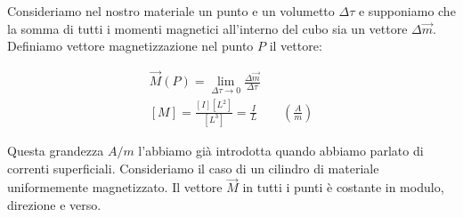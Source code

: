 Consideriamo nel nostro materiale un punto e un volumetto $ \Delta \tau  $ e supponiamo che la somma di tutti i momenti magnetici all'interno del cubo sia un vettore $ \Delta \vec{m}  $. Definiamo vettore magnetizzazione nel punto $P$ il vettore:

\begin{gather*}
	\boxed{\vec{M} (P)=\lim_{\Delta \tau \to 0} \frac{\Delta \vec{m}}{\Delta \tau}} \\
	[M]=\frac{[I][L^2 ]}{[L^3 ]} = \frac{I}{L} \qquad \left( \frac{A}{m} \right)
\end{gather*}

Questa grandezza $A/m$ l'abbiamo già introdotta quando abbiamo parlato di correnti superficiali.
Consideriamo il caso di un cilindro di materiale uniformemente magnetizzato. Il vettore $\vec{M}$ in tutti i punti è costante in modulo, direzione e verso.

